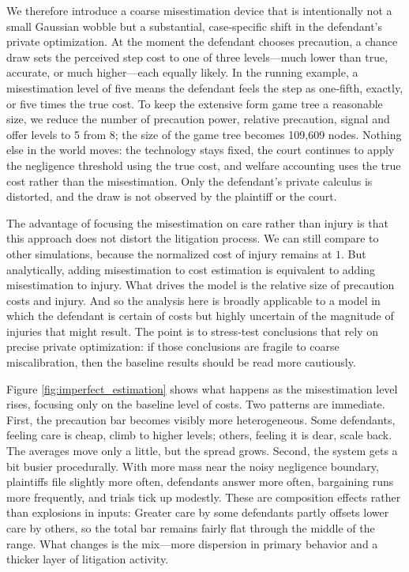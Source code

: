 \documentclass{article}
\begin{document}
We therefore introduce a coarse misestimation device that is intentionally not a small Gaussian wobble but a substantial, case‑specific shift in the defendant’s private optimization. At the moment the defendant chooses precaution, a chance draw sets the perceived step cost to one of three levels—much lower than true, accurate, or much higher—each equally likely. In the running example, a misestimation level of five means the defendant feels the step as one‑fifth, exactly, or five times the true cost. To keep the extensive form game tree a reasonable size, we reduce the number of precaution power, relative precaution, signal and offer levels to 5 from 8; the size of the game tree becomes 109,609 nodes. Nothing else in the world moves: the technology stays fixed, the court continues to apply the negligence threshold using the true cost, and welfare accounting uses the true cost rather than the misestimation. Only the defendant’s private calculus is distorted, and the draw is not observed by the plaintiff or the court. 

The advantage of focusing the misestimation on care rather than injury is that this approach does not distort the litigation process. We can still compare to other simulations, because the normalized cost of injury remains at $1$. But analytically, adding misestimation to cost estimation is equivalent to adding misestimation to injury. What drives the model is the relative size of precaution costs and injury. And so the analysis here is broadly applicable to a model in which the defendant is certain of costs but highly uncertain of the magnitude of injuries that might result. The point is to stress‑test conclusions that rely on precise private optimization: if those conclusions are fragile to coarse miscalibration, then the baseline results should be read more cautiously.

Figure \ref{fig:imperfect_estimation} shows what happens as the misestimation level rises, focusing only on the baseline level of costs. Two patterns are immediate. First, the precaution bar becomes visibly more heterogeneous. Some defendants, feeling care is cheap, climb to higher levels; others, feeling it is dear, scale back. The averages move only a little, but the spread grows. Second, the system gets a bit busier procedurally. With more mass near the noisy negligence boundary, plaintiffs file slightly more often, defendants answer more often, bargaining runs more frequently, and trials tick up modestly. These are composition effects rather than explosions in inputs: Greater care by some defendants partly offsets lower care by others, so the total bar remains fairly flat through the middle of the range. What changes is the mix—more dispersion in primary behavior and a thicker layer of litigation activity.
\end{document}
